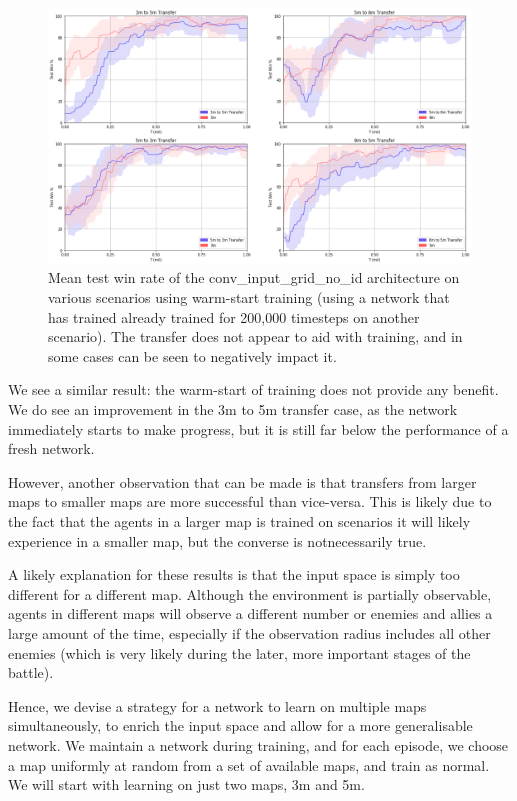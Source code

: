\begin{figure}[h]
    \centering
    \hbox{\hspace{-5em}\includegraphics[width=1.2\textwidth]{images/graphs/2.png}}
    \caption{Mean test win rate of the conv\_input\_grid\_no\_id architecture on various scenarios using warm-start training (using a network that has trained already trained for 200,000 timesteps on another scenario). The transfer does not appear to aid with training, and in some cases can be seen to negatively impact it.}
    \label{fig:transfer2}
\end{figure}

We see a similar result: the warm-start of training does not provide any benefit. We do see an improvement in the 3m to 5m transfer case, as the network immediately starts to make progress, but it is still far below the performance of a fresh network.

However, another observation that can be made is that transfers from larger maps to smaller maps are more successful than vice-versa. This is likely due to the fact that the agents in a larger map is trained on scenarios it will likely experience in a smaller map, but the converse is notnecessarily true.


A likely explanation for these results is that the input space is simply too different for a different map. Although the environment is partially observable, agents in different maps will observe a different number or enemies and allies a large amount of the time, especially if the observation radius includes all other enemies (which is very likely during the later, more important stages of the battle). 

Hence, we devise a strategy for a network to learn on multiple maps simultaneously, to enrich the input space and allow for a more generalisable network. We maintain a network during training, and for each episode, we choose a map uniformly at random from a set of available maps, and train as normal. We will start with learning on just two maps, 3m and 5m.

